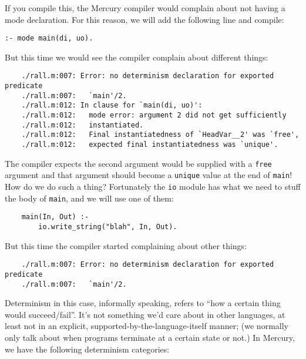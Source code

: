If you compile this, the Mercury compiler would complain about not having a mode declaration. For this reason, we will add the following line and compile:

\begin{lstlisting}[language=Mercury]
	:- mode main(di, uo).
\end{lstlisting}

But this time we would see the compiler complain about different things:

\begin{lstlisting}
	./rall.m:007: Error: no determinism declaration for exported predicate
	./rall.m:007:   `main'/2.
	./rall.m:012: In clause for `main(di, uo)':
	./rall.m:012:   mode error: argument 2 did not get sufficiently
	./rall.m:012:   instantiated.
	./rall.m:012:   Final instantiatedness of `HeadVar__2' was `free',
	./rall.m:012:   expected final instantiatedness was `unique'.
\end{lstlisting}

The compiler expects the second argument would be supplied with a \texttt{free} argument and that argument should become a \texttt{unique} value at the end of \texttt{main}! How do we do such a thing? Fortunately the \texttt{io} module has what we need to stuff the body of \texttt{main}, and we will use one of them:

\begin{lstlisting}
	main(In, Out) :-
	    io.write_string("blah", In, Out).
\end{lstlisting}

But this time the compiler started complaining about other things:

\begin{lstlisting}
	./rall.m:007: Error: no determinism declaration for exported predicate
	./rall.m:007:   `main'/2.
\end{lstlisting}

Determinism in this case, informally speaking, refers to ``how a certain thing would succeed/fail''. It's not something we'd care about in other languages, at least not in an explicit, supported-by-the-language-itself manner; (we normally only talk about when programs terminate at a certain state or not.) In Mercury, we have the following determinism categories:

